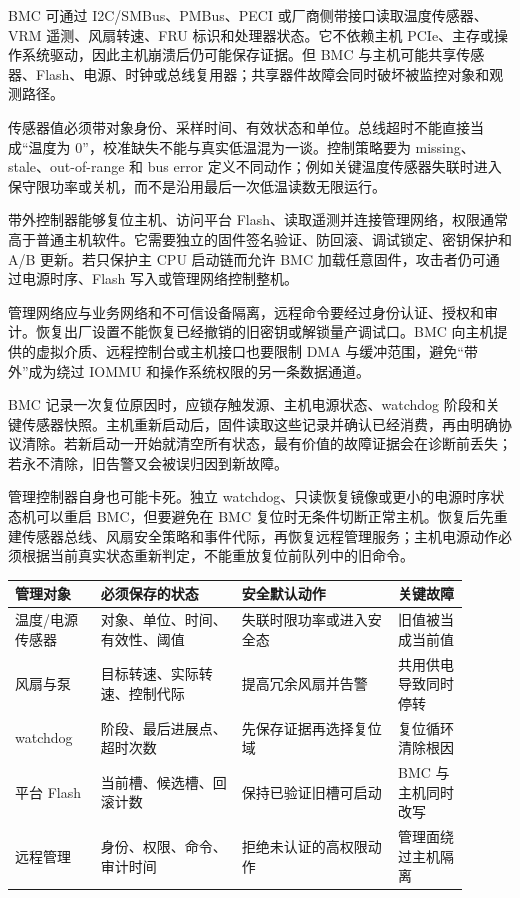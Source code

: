 
BMC 可通过 I2C/SMBus、PMBus、PECI 或厂商侧带接口读取温度传感器、VRM 遥测、风扇转速、FRU 标识和处理器状态。它不依赖主机 PCIe、主存或操作系统驱动，因此主机崩溃后仍可能保存证据。但 BMC 与主机可能共享传感器、Flash、电源、时钟或总线复用器；共享器件故障会同时破坏被监控对象和观测路径。

传感器值必须带对象身份、采样时间、有效状态和单位。总线超时不能直接当成“温度为 0”，校准缺失不能与真实低温混为一谈。控制策略要为 missing、stale、out-of-range 和 bus error 定义不同动作；例如关键温度传感器失联时进入保守限功率或关机，而不是沿用最后一次低温读数无限运行。


带外控制器能够复位主机、访问平台 Flash、读取遥测并连接管理网络，权限通常高于普通主机软件。它需要独立的固件签名验证、防回滚、调试锁定、密钥保护和 A/B 更新。若只保护主 CPU 启动链而允许 BMC 加载任意固件，攻击者仍可通过电源时序、Flash 写入或管理网络控制整机。

管理网络应与业务网络和不可信设备隔离，远程命令要经过身份认证、授权和审计。恢复出厂设置不能恢复已经撤销的旧密钥或解锁量产调试口。BMC 向主机提供的虚拟介质、远程控制台或主机接口也要限制 DMA 与缓冲范围，避免“带外”成为绕过 IOMMU 和操作系统权限的另一条数据通道。


BMC 记录一次复位原因时，应锁存触发源、主机电源状态、watchdog 阶段和关键传感器快照。主机重新启动后，固件读取这些记录并确认已经消费，再由明确协议清除。若新启动一开始就清空所有状态，最有价值的故障证据会在诊断前丢失；若永不清除，旧告警又会被误归因到新故障。

管理控制器自身也可能卡死。独立 watchdog、只读恢复镜像或更小的电源时序状态机可以重启 BMC，但要避免在 BMC 复位时无条件切断正常主机。恢复后先重建传感器总线、风扇安全策略和事件代际，再恢复远程管理服务；主机电源动作必须根据当前真实状态重新判定，不能重放复位前队列中的旧命令。

\begin{longtable}{L{0.17\linewidth}L{0.28\linewidth}L{0.31\linewidth}L{0.14\linewidth}}
\toprule
管理对象 & 必须保存的状态 & 安全默认动作 & 关键故障 \\
\midrule
温度/电源传感器 & 对象、单位、时间、有效性、阈值 & 失联时限功率或进入安全态 & 旧值被当成当前值 \\\tablerowrule
风扇与泵 & 目标转速、实际转速、控制代际 & 提高冗余风扇并告警 & 共用供电导致同时停转 \\\tablerowrule
watchdog & 阶段、最后进展点、超时次数 & 先保存证据再选择复位域 & 复位循环清除根因 \\\tablerowrule
平台 Flash & 当前槽、候选槽、回滚计数 & 保持已验证旧槽可启动 & BMC 与主机同时改写 \\\tablerowrule
远程管理 & 身份、权限、命令、审计时间 & 拒绝未认证的高权限动作 & 管理面绕过主机隔离 \\
\bottomrule
\end{longtable}

